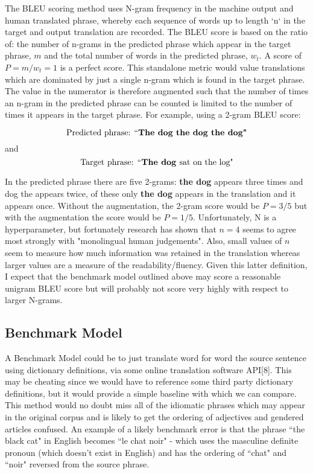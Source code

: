 \documentclass[]{article}
\begin{document}
The BLEU scoring method uses N-gram frequency in the machine output and human translated phrase, whereby each sequence of words up to length `n` in the target and output translation are recorded. The BLEU score is based on the ratio of: the number of n-grams in the predicted phrase which appear in the target phrase, $m$ and the total number of words in the predicted phrase, $w_t$. A score of $P=m/w_t=1$ is a perfect score. This standalone metric would value translations which are dominated by just a single n-gram which is found in the target phrase. The value in the numerator is therefore augmented such that the number of times an n-gram in the predicted phrase can be counted is limited to the number of times it appears in the target phrase. For example, using a 2-gram BLEU score:

\begin{equation}
\textnormal{Predicted phrase: } ``\textbf{The dog the dog the dog"}
\end{equation}
and 
\begin{equation}
\textnormal{Target phrase: } ``\textbf{The dog } \textnormal{sat on the log"}
\end{equation}



In the predicted phrase there are five 2-grams: \textbf{the dog} appears three times and dog the appears twice, of these only \textbf{the dog} appears in the translation and it appears once. Without the augmentation, the 2-gram score would be $P=3/5$ but with the augmentation the score would be $P=1/5$. Unfortunately, N is a hyperparameter, but fortunately research has shown that $n=4$ seems to agree most strongly with "monolingual human judgements". Also, small values of $n$ seem to measure how much information was retained in the translation whereas larger values are a measure of the readability/fluency. Given this latter definition, I expect that the benchmark model outlined above may score a reasonable unigram BLEU score but will probably not score very highly with respect to larger N-grams.


\subsection{Benchmark Model}
A Benchmark Model could be to just translate word for word the source sentence using dictionary definitions, via some online translation software API[8]. This may be cheating since we would have to reference some third party dictionary definitions, but it would provide a simple baseline with which we can compare. This method would no doubt miss all of the idiomatic phrases which may appear in the original corpus and is likely to get the ordering of adjectives and gendered articles confused. An example of a likely benchmark error is that the phrase ``the black cat" in English becomes ``le chat noir" - which uses the masculine definite pronoun (which doesn't exist in English) and has the ordering of ``chat" and ``noir" reversed from the source phrase.
\end{document}
